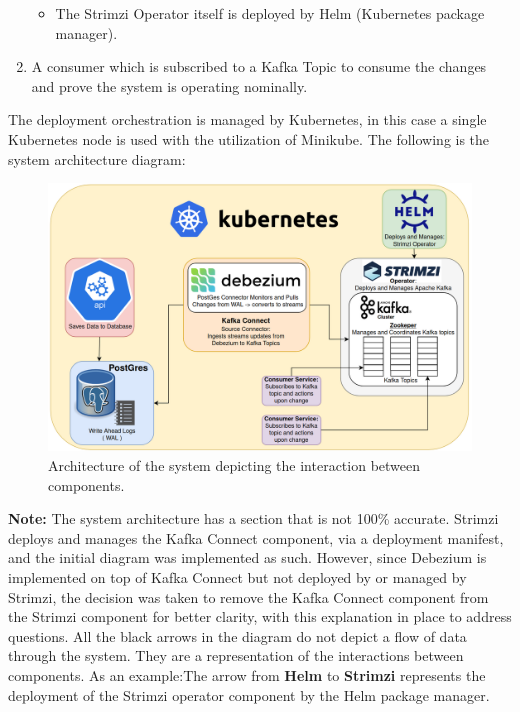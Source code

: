 \begin{flushleft}
\begin{enumerate}
\begin{itemize}
			\item The Strimzi Operator itself is deployed by Helm (Kubernetes package manager).
		\end{itemize}
		\item A consumer which is subscribed to a Kafka Topic to consume the changes and prove the system is operating nominally.
	\end{enumerate}
	The deployment orchestration is managed by Kubernetes, in this case a single Kubernetes node is used with the utilization of Minikube\autocite{MinikubeStart}.
	The following is the system architecture diagram:
	\begin{figure}[ht]
		\begin{center}
			\includegraphics[width=1\textwidth]{figures/architecture_v2.png}
			\caption{Architecture of the system depicting the interaction between components.}
			\label{fig: 1.1}
		\end{center}
	\end{figure}
	\bigbreak
	\textbf{Note:} The system architecture has a section that is not 100\% accurate. Strimzi deploys and manages the Kafka Connect component, via a deployment manifest,
	and the initial diagram was implemented as such. However, since Debezium is implemented on top of Kafka Connect but not deployed by or managed by Strimzi, the decision
	was taken to remove the Kafka Connect component	from the Strimzi component for better clarity, with this explanation in place to address questions.
	\bigbreak
	All the black arrows in the diagram do not depict a flow of data through the system. They are a representation of the interactions between
	components. As an example:\newline The arrow from \textbf{Helm}	to \textbf{Strimzi} represents the deployment of the Strimzi operator component by the
	Helm package manager.



\end{flushleft}
